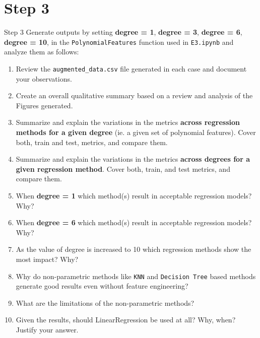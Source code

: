 \section*{Step 3}

\begin{custombox}[label={box:Q3}]{Step 3}
	Generate outputs by setting \textbf{degree = 1}, \textbf{degree = 3}, \textbf{degree = 6}, \textbf{degree = 10}, in the \verb|PolynomialFeatures| function used in \verb|E3.ipynb| and analyze them as follows:
	\begin{enumerate}[label=(\alph*)]
		\item Review the \verb|augmented_data.csv| file generated in each case and document your observations.
		\item Create an overall qualitative summary based on a review and analysis of the Figures generated.
		\item Summarize and explain the variations in the metrics \textbf{across regression methods for a given degree} (ie. a given set of polynomial features). Cover both, train and test, metrics, and compare them.
		\item Summarize and explain the variations in the metrics \textbf{across degrees for a given regression method}. Cover both, train, and test metrics, and compare them.
		\item When \textbf{degree = 1} which method(s) result in acceptable regression models? Why?
		\item When \textbf{degree = 6} which method(s) result in acceptable regression models? Why?
		\item As the value of degree is increased to 10 which regression methods show the most impact? Why?
		\item Why do non-parametric methods like \verb|KNN| and \verb|Decision Tree| based methods generate good results even without feature engineering?
		\item What are the limitations of the non-parametric methods?
		\item  Given the results, should LinearRegression be used at all? Why, when? Justify your answer.
	\end{enumerate}
\end{custombox}

\clearpage